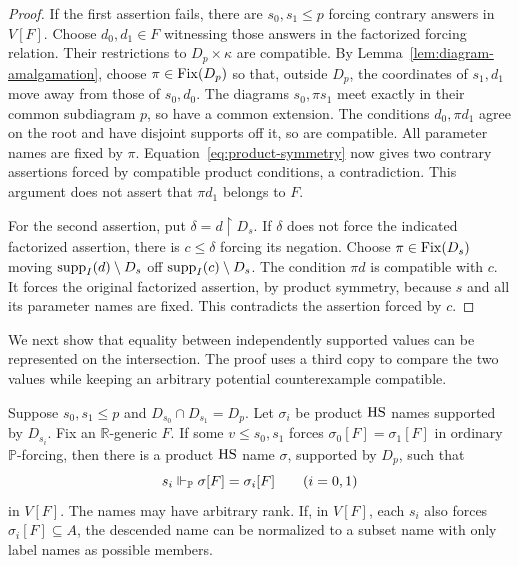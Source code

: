 \begin{proof}
If the first assertion fails, there are \(s_0,s_1\leq p\)
forcing contrary answers in \(V[F]\).
Choose \(d_0,d_1\in F\) witnessing those answers in the factorized
forcing relation.  Their restrictions to \(D_p\times\kappa\)
are compatible.
By Lemma~\ref{lem:diagram-amalgamation}, choose
\(\pi\in\operatorname{Fix}(D_p)\) so that, outside \(D_p\), the coordinates
of \(s_1,d_1\) move away from those of \(s_0,d_0\).
The diagrams \(s_0,\pi s_1\) meet exactly in their common
subdiagram \(p\), so have a common extension.
The conditions \(d_0,\pi d_1\) agree on the root and have
disjoint supports off it, so are compatible.
All parameter names are fixed by \(\pi\).
Equation~\eqref{eq:product-symmetry} now gives two contrary assertions
forced by compatible product conditions, a contradiction.
This argument does not assert that \(\pi d_1\) belongs to \(F\).

For the second assertion, put \(\delta=d\restriction D_s\).
If \(\delta\) does not force the indicated factorized assertion,
there is \(c\leq\delta\) forcing its negation.
Choose \(\pi\in\operatorname{Fix}(D_s)\) moving
\(\operatorname{supp}_I(d)\setminus D_s\) off \(\operatorname{supp}_I(c)\setminus D_s\).
The condition \(\pi d\) is compatible with \(c\).
It forces the original factorized assertion, by product symmetry,
because \(s\) and all its parameter names are fixed.
This contradicts the assertion forced by \(c\).
\end{proof}

We next show that equality between independently supported values
can be represented on the intersection.  The proof uses a third copy
to compare the two values while keeping an arbitrary potential
counterexample compatible.

\begin{lemma}\label{lem:support-descent}
Suppose \(s_0,s_1\leq p\) and
\(D_{s_0}\cap D_{s_1}=D_p\).
Let \(\sigma_i\) be product \(\mathrm{HS}\) names supported by \(D_{s_i}\).
Fix an \(\mathbb R\)-generic \(F\).
If some \(v\leq s_0,s_1\) forces
\(\sigma_0[F]=\sigma_1[F]\) in ordinary \(\mathbb P\)-forcing,
then there is a product \(\mathrm{HS}\) name \(\sigma\), supported by
\(D_p\), such that
\[
 s_i\Vdash_{\mathbb P}\sigma[F]=\sigma_i[F]
 \qquad(i=0,1)
\]
in \(V[F]\).
The names may have arbitrary rank.
If, in \(V[F]\), each \(s_i\) also forces
\(\sigma_i[F]\subseteq A\), the descended name can be normalized
to a subset name with only label names as possible members.
\end{lemma}

